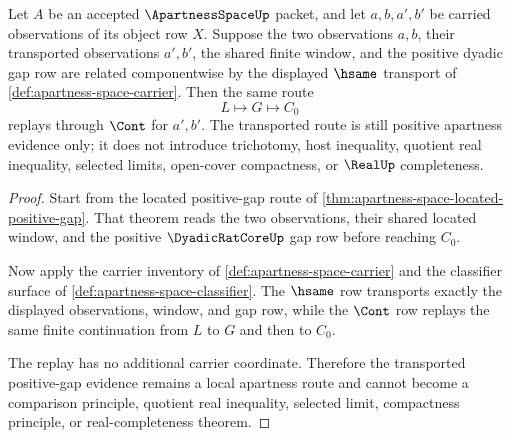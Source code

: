 \begin{theorem}
\label{thm:apartness-space-positive-gap-transport}
Let $A$ be an accepted $\ApartnessSpaceUp$ packet, and let $a,b,a',b'$ be
carried observations of its object row $X$. Suppose the two observations
$a,b$, their transported observations $a',b'$, the shared finite window, and
the positive dyadic gap row are related componentwise by the displayed
$\hsame$ transport of \autoref{def:apartness-space-carrier}. Then the same
route
$$
L\longmapsto G\longmapsto C_0
$$
replays through $\Cont$ for $a',b'$. The transported route is still positive
apartness evidence only; it does not introduce trichotomy, host inequality,
quotient real inequality, selected limits, open-cover compactness, or
$\RealUp$ completeness.
\end{theorem}
\begin{proof}
Start from the located positive-gap route of
\autoref{thm:apartness-space-located-positive-gap}. That theorem reads the two
observations, their shared located window, and the positive
$\DyadicRatCoreUp$ gap row before reaching $C_0$.

Now apply the carrier inventory of \autoref{def:apartness-space-carrier} and
the classifier surface of \autoref{def:apartness-space-classifier}. The
$\hsame$ row transports exactly the displayed observations, window, and gap
row, while the $\Cont$ row replays the same finite continuation from $L$ to
$G$ and then to $C_0$.

The replay has no additional carrier coordinate. Therefore the transported
positive-gap evidence remains a local apartness route and cannot become a
comparison principle, quotient real inequality, selected limit, compactness
principle, or real-completeness theorem.
\end{proof}

